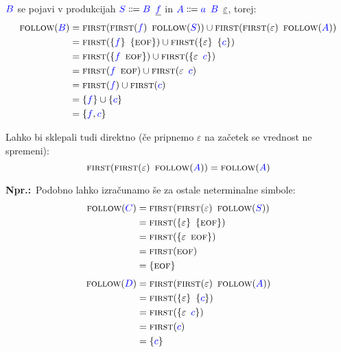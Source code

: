 \documentclass{article}
\newcommand{\Ex}{\textbf{Npr.:}\ }
\newcommand{\FIRST}{\textsc{first}}
\newcommand{\FOLLOW}{\textsc{follow}}
\newcommand{\EOF}{\textsc{eof}}
\newcommand{\Symbol}[1]{\textcolor{blue}{#1}}
\newcommand{\Null}{\varepsilon}
\newcommand{\Arrow}{\Coloneq}
\newcommand{\Seq}{{\ \,}}
\begin{document}
$\Symbol{B}$ se pojavi v produkcijah $\Symbol{S} \Arrow \Symbol{B} \Seq \underline{\Symbol{f}}$ in $\Symbol{A} \Arrow \Symbol{a} \Seq \Symbol{B} \Seq \underline{\Null}$, torej:
\begin{align*}
  \FOLLOW(\Symbol{B}) &= \FIRST(\FIRST(\Symbol{f}) \Seq \FOLLOW(\Symbol{S})) \cup \FIRST(\FIRST(\Null) \Seq \FOLLOW(\Symbol{A})) \\
             &= \FIRST(\{\Symbol{f}\} \Seq \{\EOF\}) \cup \FIRST(\{\Null\} \Seq \{\Symbol{c}\}) \\
             &= \FIRST(\{\Symbol{f} \Seq \EOF\}) \cup \FIRST(\{\Null \Seq \Symbol{c}\}) \\
             &= \FIRST(\Symbol{f} \Seq \EOF) \cup \FIRST(\Null \Seq \Symbol{c}) \\
             &= \FIRST(\Symbol{f}) \cup \FIRST(\Symbol{c})\\
             &= \{\Symbol{f}\} \cup \{\Symbol{c}\}\\
             &= \{\Symbol{f}, \Symbol{c}\}
\end{align*}

Lahko bi sklepali tudi direktno (če pripnemo $\Null$ na začetek se vrednost ne spremeni):
\begin{equation*}
  \FIRST(\FIRST(\Null) \Seq \FOLLOW(\Symbol{A})) = \FOLLOW(\Symbol{A})
\end{equation*}

\Ex Podobno lahko izračunamo še za ostale neterminalne simbole:
\begin{align*}
  \FOLLOW(\Symbol{C}) &= \FIRST(\FIRST(\Null) \Seq \FOLLOW(\Symbol{S})) \\
             &= \FIRST(\{\Null\} \Seq \{\EOF\})\\
             &= \FIRST(\{\Null \Seq \EOF\})\\
             &= \FIRST(\EOF) \\
             &= \{\EOF\}
\end{align*}
\begin{align*}
  \FOLLOW(\Symbol{D}) &= \FIRST(\FIRST(\Null) \Seq \FOLLOW(\Symbol{A})) \\
             &= \FIRST(\{\Null\} \Seq \{\Symbol{c}\})\\
             &= \FIRST(\{\Null \Seq \Symbol{c}\})\\
             &= \FIRST(\Symbol{c}) \\
             &= \{\Symbol{c}\}
\end{align*}
\end{document}
